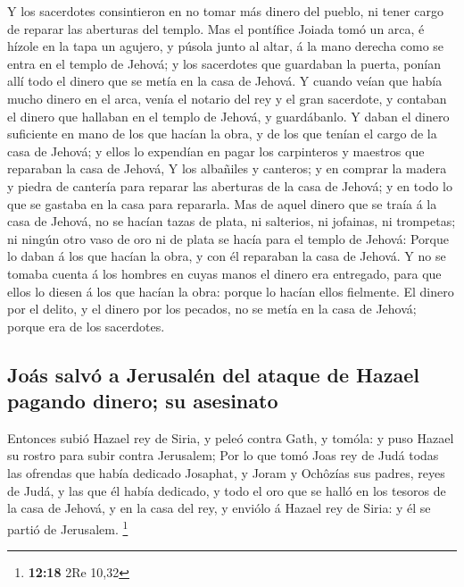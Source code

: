  Y los sacerdotes consintieron en no tomar más dinero del
pueblo, ni tener cargo de reparar las aberturas del templo. 
Mas el pontífice Joiada tomó un arca, é hízole en la tapa un agujero, y
púsola junto al altar, á la mano derecha como se entra en el templo de
Jehová; y los sacerdotes que guardaban la puerta, ponían allí todo el
dinero que se metía en la casa de Jehová.  Y cuando veían
que había mucho dinero en el arca, venía el notario del rey y el gran
sacerdote, y contaban el dinero que hallaban en el templo de Jehová, y
guardábanlo.  Y daban el dinero suficiente en mano de los
que hacían la obra, y de los que tenían el cargo de la casa de Jehová; y
ellos lo expendían en pagar los carpinteros y maestros que reparaban la
casa de Jehová,  Y los albañiles y canteros; y en comprar
la madera y piedra de cantería para reparar las aberturas de la casa de
Jehová; y en todo lo que se gastaba en la casa para repararla.
 Mas de aquel dinero que se traía á la casa de Jehová, no
se hacían tazas de plata, ni salterios, ni jofainas, ni trompetas; ni
ningún otro vaso de oro ni de plata se hacía para el templo de Jehová:
 Porque lo daban á los que hacían la obra, y con él
reparaban la casa de Jehová.  Y no se tomaba cuenta á los
hombres en cuyas manos el dinero era entregado, para que ellos lo diesen
á los que hacían la obra: porque lo hacían ellos fielmente.
 El dinero por el delito, y el dinero por los pecados, no
se metía en la casa de Jehová; porque era de los sacerdotes.

\hypertarget{jouxe1s-salvuxf3-a-jerusaluxe9n-del-ataque-de-hazael-pagando-dinero-su-asesinato}{%
\subsection{Joás salvó a Jerusalén del ataque de Hazael pagando dinero;
su
asesinato}\label{jouxe1s-salvuxf3-a-jerusaluxe9n-del-ataque-de-hazael-pagando-dinero-su-asesinato}}

 Entonces subió Hazael rey de Siria, y peleó contra Gath, y
tomóla: y puso Hazael su rostro para subir contra Jerusalem;
 Por lo que tomó Joas rey de Judá todas las ofrendas que
había dedicado Josaphat, y Joram y Ochôzías sus padres, reyes de Judá, y
las que él había dedicado, y todo el oro que se halló en los tesoros de
la casa de Jehová, y en la casa del rey, y enviólo á Hazael rey de
Siria: y él se partió de Jerusalem. \footnote{\textbf{12:18} 2Re 10,32}

